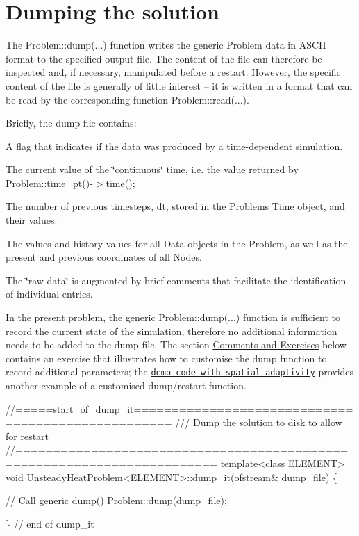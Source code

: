  

\hypertarget{index_dump}{}\section{Dumping the solution}\label{index_dump}
The {\ttfamily Problem\+::dump}(...) function writes the generic {\ttfamily Problem} data in A\+S\+C\+II format to the specified output file. The content of the file can therefore be inspected and, if necessary, manipulated before a restart. However, the specific content of the file is generally of little interest -- it is written in a format that can be read by the corresponding function {\ttfamily Problem\+::read}(...).

Briefly, the dump file contains\+:
\begin{DoxyItemize}
\item A flag that indicates if the data was produced by a time-\/dependent simulation.
\item The current value of the \char`\"{}continuous\char`\"{} time, i.\+e. the value returned by {\ttfamily Problem\+::time\+\_\+pt()-\/$>$time()};
\item The number of previous timesteps, {\ttfamily dt}, stored in the {\ttfamily Problem\textquotesingle{}s} {\ttfamily Time} object, and their values.
\item The values and history values for all {\ttfamily Data} objects in the {\ttfamily Problem}, as well as the present and previous coordinates of all {\ttfamily Nodes}.
\end{DoxyItemize}The \char`\"{}raw data\char`\"{} is augmented by brief comments that facilitate the identification of individual entries.

In the present problem, the generic {\ttfamily Problem\+::dump}(...) function is sufficient to record the current state of the simulation, therefore no additional information needs to be added to the dump file. The section \hyperlink{index_comments}{Comments and Exercises} below contains an exercise that illustrates how to customise the dump function to record additional parameters; the \href{../../two_d_unsteady_heat_ALE/html/index.html}{\tt demo code with spatial adaptivity} provides another example of a customised dump/restart function.


\begin{DoxyCodeInclude}
\textcolor{comment}{//=====start\_of\_dump\_it===================================================}
\textcolor{comment}{/// Dump the solution to disk to allow for restart}
\textcolor{comment}{}\textcolor{comment}{//========================================================================}
\textcolor{keyword}{template}<\textcolor{keyword}{class} ELEMENT>
\textcolor{keywordtype}{void} \hyperlink{classUnsteadyHeatProblem_a9a60874a6471414819301705f1a2afd1}{UnsteadyHeatProblem<ELEMENT>::dump\_it}(ofstream& dump\_file)
\{

 \textcolor{comment}{// Call generic dump()}
 Problem::dump(dump\_file); 

\} \textcolor{comment}{// end of dump\_it}

\end{DoxyCodeInclude}




